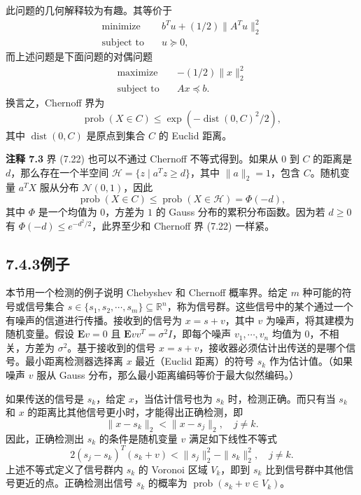 \documentclass[UTF8,12pt,a4paper,fontset=fandol]{ctexart}
\begin{document}
此问题的几何解释较为有趣。其等价于
\[
\begin{aligned}
\text{minimize}\quad & b^Tu+(1/2)\|A^Tu\|_2^2\\
\text{subject to}\quad & u\succeq 0,
\end{aligned}
\]
而上述问题是下面问题的对偶问题
\[
\begin{aligned}
\text{maximize}\quad & -(1/2)\|x\|_2^2\\
\text{subject to}\quad & Ax\preceq b.
\end{aligned}
\]
换言之，Chernoff 界为
\begin{equation}
\operatorname{prob}(X\in C)\leq \exp(-\operatorname{dist}(0,C)^2/2),
\tag{7.22}
\end{equation}
其中 $\operatorname{dist}(0,C)$ 是原点到集合 $C$ 的 Euclid 距离。

\noindent\textbf{注释 7.3}\quad
界 (7.22) 也可以不通过 Chernoff 不等式得到。如果从 $0$ 到 $C$ 的距离是 $d$，那么存在一个半空间 $\mathcal{H}=\{z\mid a^Tz\geq d\}$，其中 $\|a\|_2=1$，包含 $C$。随机变量 $a^TX$ 服从分布 $\mathcal{N}(0,1)$，因此
\[
\operatorname{prob}(X\in C)\leq\operatorname{prob}(X\in\mathcal{H})=\Phi(-d),
\]
其中 $\Phi$ 是一个均值为 $0$，方差为 $1$ 的 Gauss 分布的累积分布函数。因为若 $d\geq 0$ 有 $\Phi(-d)\leq e^{-d^2/2}$，此界至少和 Chernoff 界 (7.22) 一样紧。

\subsection*{7.4.3\quad 例子}

本节用一个检测的例子说明 Chebyshev 和 Chernoff 概率界。给定 $m$ 种可能的符号或信号集合 $s\in\{s_1,s_2,\cdots,s_m\}\subseteq\mathbb{R}^n$，称为信号群。这些信号中的某个通过一个有噪声的信道进行传播。接收到的信号为 $x=s+v$，其中 $v$ 为噪声，将其建模为随机变量。假设 $\mathbf{E}v=0$ 且 $\mathbf{E}vv^T=\sigma^2I$，即每个噪声 $v_1,\cdots,v_n$ 均值为 $0$，不相关，方差为 $\sigma^2$。基于接收到的信号 $x=s+v$，接收器必须估计出传送的是哪个信号。最小距离检测器选择离 $x$ 最近（Euclid 距离）的符号 $s_k$ 作为估计值。（如果噪声 $v$ 服从 Gauss 分布，那么最小距离编码等价于最大似然编码。）

如果传送的信号是 $s_k$，给定 $x$，当估计信号也为 $s_k$ 时，检测正确。而只有当 $s_k$ 和 $x$ 的距离比其他信号更小时，才能得出正确检测，即
\[
\|x-s_k\|_2<\|x-s_j\|_2,\quad j\neq k.
\]
因此，正确检测出 $s_k$ 的条件是随机变量 $v$ 满足如下线性不等式
\[
2(s_j-s_k)^T(s_k+v)<\|s_j\|_2^2-\|s_k\|_2^2,\quad j\neq k.
\]
上述不等式定义了信号群内 $s_k$ 的 Voronoi 区域 $V_k$，即到 $s_k$ 比到信号群中其他信号更近的点。正确检测出信号 $s_k$ 的概率为 $\operatorname{prob}(s_k+v\in V_k)$。
\end{document}
